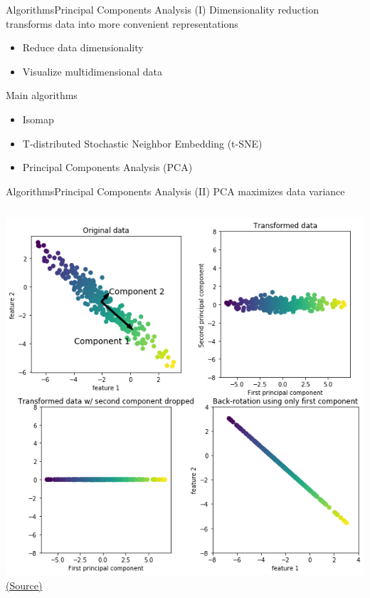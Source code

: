 \documentclass[10pt,compress]{beamer} %
\begin{document}
\begin{frame}{Algorithms}{Principal Components Analysis (I)}
	Dimensionality reduction transforms data into more convenient representations
	\begin{itemize}
		\item Reduce data dimensionality
		\item Visualize multidimensional data
	\end{itemize}

	Main algorithms
	\begin{itemize}
		\item Isomap
		\item T-distributed Stochastic Neighbor Embedding (t-SNE)
		\item Principal Components Analysis (PCA)
	\end{itemize}

\end{frame}

\begin{frame}{Algorithms}{Principal Components Analysis (II)}
	PCA maximizes data variance

    \begin{columns}
			\includegraphics[width=\linewidth]{figs/pca.png}
    		\centering \tiny{\href{https://github.com/amueller/introduction_to_ml_with_python/blob/master/03-unsupervised-learning.ipynb}{(Source)}}
    \end{columns}
\end{frame}
\end{document}

